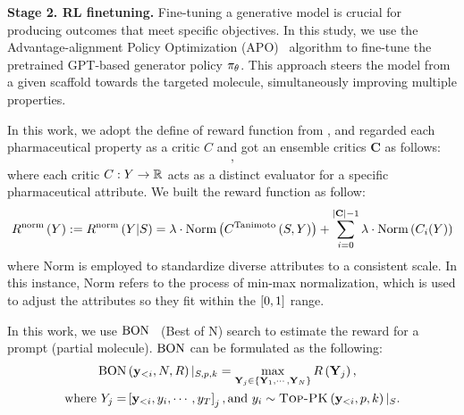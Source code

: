 \textbf{Stage 2. RL finetuning.} 
Fine-tuning a generative model is crucial for producing outcomes that meet specific objectives. In this study, we use the Advantage-alignment Policy Optimization (APO)~\citep{liu2023drugimprover} algorithm to fine-tune the pretrained GPT-based generator policy $\pi_{\theta}$. This approach steers the model from a given scaffold towards the targeted molecule, simultaneously improving multiple properties. 


In this work, we adopt the define of reward function from \citet{liu2024erp}, and regarded each pharmaceutical property as a critic $C$ and got an ensemble critics $\mathbf{C}$ as follows:
\begin{align*}
[\critic^{\text{Druglikeness}},
\critic^{\text{Solubility}},
\critic^{\text{Synthesizability}}, 
{\critic^{\text{Docking}}},\critic^{\text{{Tanimoto}}}
],
\end{align*}
where each critic ${C}: Y \rightarrow \mathbb{R}$ {acts as a distinct evaluator for a specific pharmaceutical attribute}.
We built the reward function as follow:
\begin{align}\label{eq:reward1}
{R^{\text{norm}}\ensuremath{ \left( {Y} \right) }}:=
{R^{\text{norm}} \left( {
Y|S} \right) } =\lambda\cdot\text{Norm} \left( {{C}^{\text{Tanimoto}} \left( {S,
Y} \right) } \right) 
+
\sum_{i=0}^{|\mathbf{C}|-1}\lambda\cdot\text{Norm} \left( {{C}_i{ \left( {Y} \right) }} \right) 
\end{align}
where Norm is employed to standardize diverse attributes to a consistent scale. In this instance, Norm refers to the process of min-max normalization, which is used to adjust the attributes so they fit within the $\left[0,1\right]$ range. 

In this work, we use $\text{{{BON}}}$~\citep{gao2023scaling} (Best of N) search to estimate the reward for a prompt (partial molecule). $\text{{{BON}}}$ can be formulated as the following:
\begin{align}\label{eq:bon}
{\text{{{BON}}}}& \left( {\mathbf{y}_{<i},N,R} \right) |_{S,p,k}= \max_{\mathbf{Y}_{j}\in \left\{\mathbf{Y}_1,\cdots,\mathbf{Y}_{N}\right\}} R \left( { \mathbf{Y}_{j}} \right) ,\\
\text{where } Y_j=&\left[\mathbf{y}_{<i},y_i,\cdots,y_{T}\right]_j, \text{and }
y_i \sim \textsc{Top-PK} \left( {\mathbf{y}_{<i},p, k} \right) |_{S}.\notag
\end{align}

